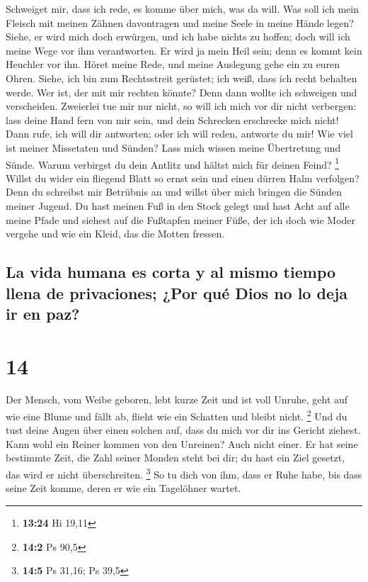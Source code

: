  Schweiget mir, dass ich rede, es komme über mich, was da
will.  Was soll ich mein Fleisch mit meinen Zähnen
davontragen und meine Seele in meine Hände legen?  Siehe,
er wird mich doch erwürgen, und ich habe nichts zu hoffen; doch will ich
meine Wege vor ihm verantworten.  Er wird ja mein Heil
sein; denn es kommt kein Heuchler vor ihn.  Höret meine
Rede, und meine Auslegung gehe ein zu euren Ohren. 
Siehe, ich bin zum Rechtsstreit gerüstet; ich weiß, dass ich recht
behalten werde.  Wer ist, der mit mir rechten könnte?
Denn dann wollte ich schweigen und verscheiden. 
Zweierlei tue mir nur nicht, so will ich mich vor dir nicht verbergen:
 lass deine Hand fern von mir sein, und dein Schrecken
erschrecke mich nicht!  Dann rufe, ich will dir
antworten; oder ich will reden, antworte du mir!  Wie
viel ist meiner Missetaten und Sünden? Lass mich wissen meine
Übertretung und Sünde.  Warum verbirgst du dein Antlitz
und hältst mich für deinen Feind? \footnote{\textbf{13:24} Hi 19,11}
 Willst du wider ein fliegend Blatt so ernst sein und
einen dürren Halm verfolgen?  Denn du schreibst mir
Betrübnis an und willst über mich bringen die Sünden meiner Jugend.
 Du hast meinen Fuß in den Stock gelegt und hast Acht auf
alle meine Pfade und siehest auf die Fußtapfen meiner Füße,
 der ich doch wie Moder vergehe und wie ein Kleid, das
die Motten fressen.

\hypertarget{la-vida-humana-es-corta-y-al-mismo-tiempo-llena-de-privaciones-por-quuxe9-dios-no-lo-deja-ir-en-paz}{%
\subsection{La vida humana es corta y al mismo tiempo llena de
privaciones; ¿Por qué Dios no lo deja ir en
paz?}\label{la-vida-humana-es-corta-y-al-mismo-tiempo-llena-de-privaciones-por-quuxe9-dios-no-lo-deja-ir-en-paz}}

\hypertarget{section-13}{%
\section{14}\label{section-13}}

 Der Mensch, vom Weibe geboren, lebt kurze Zeit und ist
voll Unruhe,  geht auf wie eine Blume und fällt ab, flieht
wie ein Schatten und bleibt nicht. \footnote{\textbf{14:2} Ps 90,5}
 Und du tust deine Augen über einen solchen auf, dass du
mich vor dir ins Gericht ziehest.  Kann wohl ein Reiner
kommen von den Unreinen? Auch nicht einer.  Er hat seine
bestimmte Zeit, die Zahl seiner Monden steht bei dir; du hast ein Ziel
gesetzt, das wird er nicht überschreiten. \footnote{\textbf{14:5} Ps
  31,16; Ps 39,5}  So tu dich von ihm, dass er Ruhe habe,
bis dass seine Zeit komme, deren er wie ein Tagelöhner wartet.

